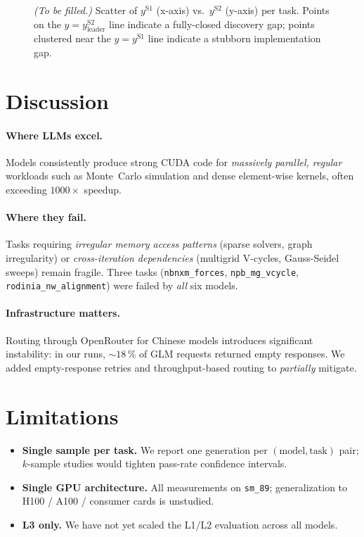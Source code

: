\documentclass{article}
\begin{document}
\begin{figure}[ht]
\centering
\caption{\emph{(To be filled.)} Scatter of $y^{\mathrm{S1}}$ (x-axis)
vs.\ $y^{\mathrm{S2}}$ (y-axis) per task. Points on the
$y = y^{\mathrm{S2}}_{\mathrm{leader}}$ line indicate a fully-closed
discovery gap; points clustered near the $y = y^{\mathrm{S1}}$ line
indicate a stubborn implementation gap.}
\label{fig:transfer}
\end{figure}

\section{Discussion}
\label{sec:discussion}

\paragraph{Where LLMs excel.} Models consistently produce strong
CUDA code for \emph{massively parallel, regular} workloads such as
Monte~Carlo simulation and dense element-wise kernels, often exceeding
$1000\times$ speedup.

\paragraph{Where they fail.} Tasks requiring \emph{irregular memory
access patterns} (sparse solvers, graph irregularity) or
\emph{cross-iteration dependencies} (multigrid V-cycles, Gauss-Seidel
sweeps) remain fragile. Three tasks (\texttt{nbnxm\_forces},
\texttt{npb\_mg\_vcycle}, \texttt{rodinia\_nw\_alignment}) were failed
by \emph{all} six models.

\paragraph{Infrastructure matters.} Routing through OpenRouter for
Chinese models introduces significant instability: in our runs,
$\sim 18\,\%$ of GLM requests returned empty responses. We added
empty-response retries and throughput-based routing to \emph{partially}
mitigate.

\section{Limitations}
\label{sec:limitations}

\begin{itemize}
  \item \textbf{Single sample per task.} We report one generation per
        $(\text{model},\text{task})$ pair; $k$-sample studies would
        tighten pass-rate confidence intervals.
  \item \textbf{Single GPU architecture.} All measurements on
        \texttt{sm\_89}; generalization to H100 / A100 / consumer
        cards is unstudied.
  \item \textbf{L3 only.} We have not yet scaled the L1/L2 evaluation
        across all models.
\end{itemize}
\end{document}
